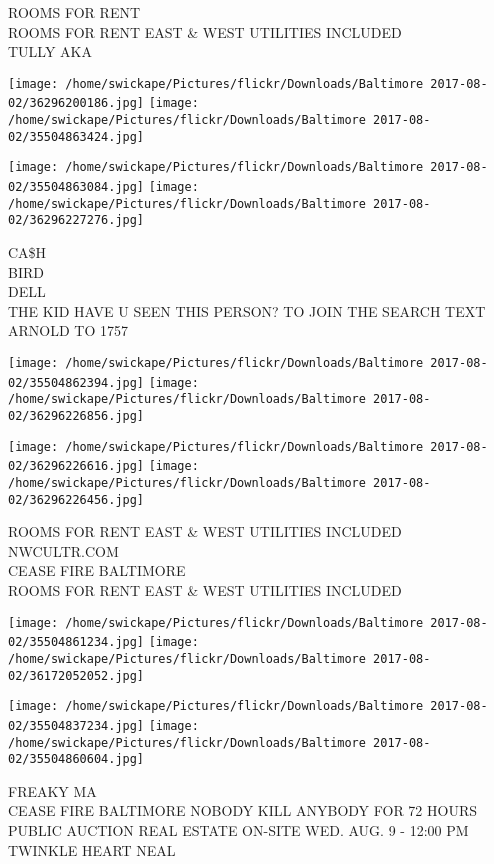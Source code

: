 \documentclass[10pt,letterpaper]{article}
\begin{document}
ROOMS FOR RENT\\
ROOMS FOR RENT EAST \& WEST UTILITIES INCLUDED\\
TULLY AKA\\
\pagebreak

\texttt{[image: /home/swickape/Pictures/flickr/Downloads/Baltimore 2017-08-02/36296200186.jpg]}
\texttt{[image: /home/swickape/Pictures/flickr/Downloads/Baltimore 2017-08-02/35504863424.jpg]}

\texttt{[image: /home/swickape/Pictures/flickr/Downloads/Baltimore 2017-08-02/35504863084.jpg]}
\texttt{[image: /home/swickape/Pictures/flickr/Downloads/Baltimore 2017-08-02/36296227276.jpg]}

CA\$H\\
BIRD\\
DELL\\
THE KID HAVE U SEEN THIS PERSON?  TO JOIN THE SEARCH TEXT ARNOLD TO 1757\\
\pagebreak

\texttt{[image: /home/swickape/Pictures/flickr/Downloads/Baltimore 2017-08-02/35504862394.jpg]}
\texttt{[image: /home/swickape/Pictures/flickr/Downloads/Baltimore 2017-08-02/36296226856.jpg]}

\texttt{[image: /home/swickape/Pictures/flickr/Downloads/Baltimore 2017-08-02/36296226616.jpg]}
\texttt{[image: /home/swickape/Pictures/flickr/Downloads/Baltimore 2017-08-02/36296226456.jpg]}

ROOMS FOR RENT EAST \& WEST UTILITIES INCLUDED\\
NWCULTR.COM\\
CEASE FIRE BALTIMORE\\
ROOMS FOR RENT EAST \& WEST UTILITIES INCLUDED\\
\pagebreak

\texttt{[image: /home/swickape/Pictures/flickr/Downloads/Baltimore 2017-08-02/35504861234.jpg]}
\texttt{[image: /home/swickape/Pictures/flickr/Downloads/Baltimore 2017-08-02/36172052052.jpg]}

\texttt{[image: /home/swickape/Pictures/flickr/Downloads/Baltimore 2017-08-02/35504837234.jpg]}
\texttt{[image: /home/swickape/Pictures/flickr/Downloads/Baltimore 2017-08-02/35504860604.jpg]}

FREAKY MA\\
CEASE FIRE BALTIMORE NOBODY KILL ANYBODY FOR 72 HOURS\\
PUBLIC AUCTION REAL ESTATE ON{-}SITE WED. AUG. 9 {-} 12:00 PM\\
TWINKLE HEART NEAL\\
\pagebreak
\end{document}
